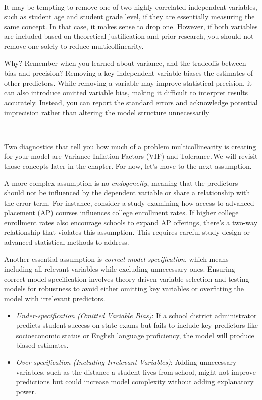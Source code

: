 \documentclass[
  letterpaper,
  DIV=11,
  numbers=noendperiod]{scrreprt}
\begin{document}
\,

It may be tempting to remove one of two highly correlated independent
variables, such as student age and student grade level, if they are
essentially measuring the same concept. In that case, it makes sense to
drop one. However, if both variables are included based on theoretical
justification and prior research, you should not remove one solely to
reduce multicollinearity.\,

Why? Remember when you learned about variance, and the tradeoffs between
bias and precision? Removing a key independent variable biases the
estimates of other predictors. While removing a variable may improve
statistical precision, it can also introduce omitted variable bias,
making it difficult to interpret results accurately. Instead, you can
report the standard errors and acknowledge potential imprecision rather
than altering the model structure unnecessarily

\,

Two diagnostics that tell you how much of a problem multicollinearity is
creating for your model are Variance Inflation Factors (VIF) and
Tolerance.\,We will revisit those concepts later in the chapter. For
now, let's move to the next assumption.

A more complex assumption is no \emph{endogeneity}, meaning that the
predictors should not be influenced by the dependent variable or share a
relationship with the error term. For instance, consider a study
examining how access to advanced placement (AP) courses influences
college enrollment rates. If higher college enrollment rates also
encourage schools to expand AP offerings, there's a two-way relationship
that violates this assumption. This requires careful study design or
advanced statistical methods to address.

Another essential assumption is \emph{correct model specification},
which means including all relevant variables while excluding unnecessary
ones. Ensuring correct model specification involves theory-driven
variable selection and testing models for robustness to avoid either
omitting key variables or overfitting the model with irrelevant
predictors.

\begin{itemize}
\item
  \emph{Under-specification (Omitted Variable Bias)}: If a school
  district administrator predicts student success on state exams but
  fails to include key predictors like socioeconomic status or English
  language proficiency, the model will produce biased estimates.
\item
  \emph{Over-specification (Including Irrelevant Variables)}: Adding
  unnecessary variables, such as the distance a student lives from
  school, might not improve predictions but could increase model
  complexity without adding explanatory power.
\end{itemize}
\end{document}
